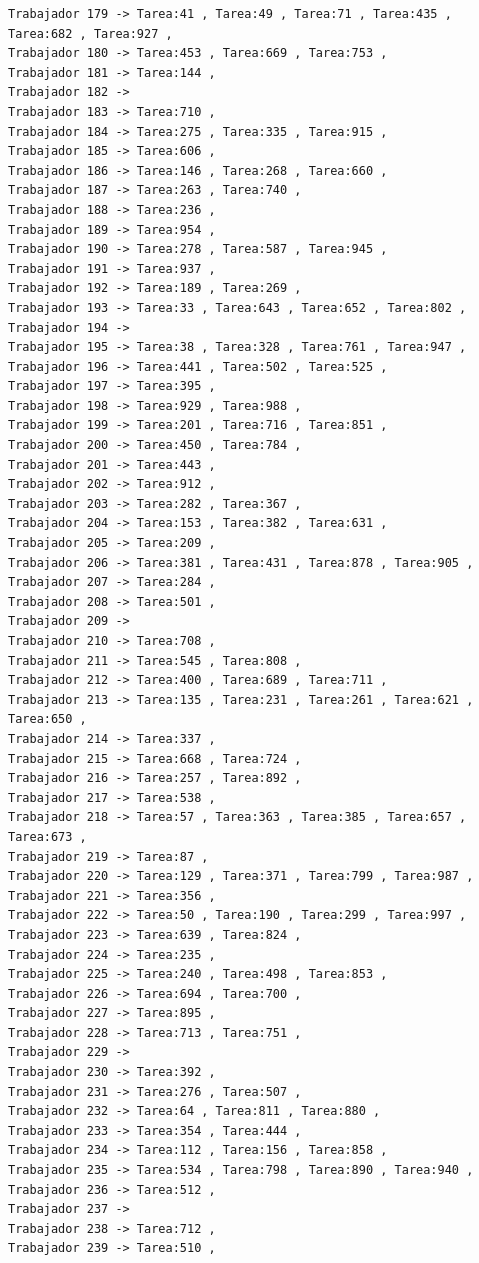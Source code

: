 \documentclass{article}
\begin{document}
\begin{lstlisting}
Trabajador 179 -> Tarea:41 , Tarea:49 , Tarea:71 , Tarea:435 , Tarea:682 , Tarea:927 , 
Trabajador 180 -> Tarea:453 , Tarea:669 , Tarea:753 , 
Trabajador 181 -> Tarea:144 , 
Trabajador 182 -> 
Trabajador 183 -> Tarea:710 , 
Trabajador 184 -> Tarea:275 , Tarea:335 , Tarea:915 , 
Trabajador 185 -> Tarea:606 , 
Trabajador 186 -> Tarea:146 , Tarea:268 , Tarea:660 , 
Trabajador 187 -> Tarea:263 , Tarea:740 , 
Trabajador 188 -> Tarea:236 , 
Trabajador 189 -> Tarea:954 , 
Trabajador 190 -> Tarea:278 , Tarea:587 , Tarea:945 , 
Trabajador 191 -> Tarea:937 , 
Trabajador 192 -> Tarea:189 , Tarea:269 , 
Trabajador 193 -> Tarea:33 , Tarea:643 , Tarea:652 , Tarea:802 , 
Trabajador 194 -> 
Trabajador 195 -> Tarea:38 , Tarea:328 , Tarea:761 , Tarea:947 , 
Trabajador 196 -> Tarea:441 , Tarea:502 , Tarea:525 , 
Trabajador 197 -> Tarea:395 , 
Trabajador 198 -> Tarea:929 , Tarea:988 , 
Trabajador 199 -> Tarea:201 , Tarea:716 , Tarea:851 , 
Trabajador 200 -> Tarea:450 , Tarea:784 , 
Trabajador 201 -> Tarea:443 , 
Trabajador 202 -> Tarea:912 , 
Trabajador 203 -> Tarea:282 , Tarea:367 , 
Trabajador 204 -> Tarea:153 , Tarea:382 , Tarea:631 , 
Trabajador 205 -> Tarea:209 , 
Trabajador 206 -> Tarea:381 , Tarea:431 , Tarea:878 , Tarea:905 , 
Trabajador 207 -> Tarea:284 , 
Trabajador 208 -> Tarea:501 , 
Trabajador 209 -> 
Trabajador 210 -> Tarea:708 , 
Trabajador 211 -> Tarea:545 , Tarea:808 , 
Trabajador 212 -> Tarea:400 , Tarea:689 , Tarea:711 , 
Trabajador 213 -> Tarea:135 , Tarea:231 , Tarea:261 , Tarea:621 , Tarea:650 , 
Trabajador 214 -> Tarea:337 , 
Trabajador 215 -> Tarea:668 , Tarea:724 , 
Trabajador 216 -> Tarea:257 , Tarea:892 , 
Trabajador 217 -> Tarea:538 , 
Trabajador 218 -> Tarea:57 , Tarea:363 , Tarea:385 , Tarea:657 , Tarea:673 , 
Trabajador 219 -> Tarea:87 , 
Trabajador 220 -> Tarea:129 , Tarea:371 , Tarea:799 , Tarea:987 , 
Trabajador 221 -> Tarea:356 , 
Trabajador 222 -> Tarea:50 , Tarea:190 , Tarea:299 , Tarea:997 , 
Trabajador 223 -> Tarea:639 , Tarea:824 , 
Trabajador 224 -> Tarea:235 , 
Trabajador 225 -> Tarea:240 , Tarea:498 , Tarea:853 , 
Trabajador 226 -> Tarea:694 , Tarea:700 , 
Trabajador 227 -> Tarea:895 , 
Trabajador 228 -> Tarea:713 , Tarea:751 , 
Trabajador 229 -> 
Trabajador 230 -> Tarea:392 , 
Trabajador 231 -> Tarea:276 , Tarea:507 , 
Trabajador 232 -> Tarea:64 , Tarea:811 , Tarea:880 , 
Trabajador 233 -> Tarea:354 , Tarea:444 , 
Trabajador 234 -> Tarea:112 , Tarea:156 , Tarea:858 , 
Trabajador 235 -> Tarea:534 , Tarea:798 , Tarea:890 , Tarea:940 , 
Trabajador 236 -> Tarea:512 , 
Trabajador 237 -> 
Trabajador 238 -> Tarea:712 , 
Trabajador 239 -> Tarea:510 , 

\end{lstlisting}
\end{document}
